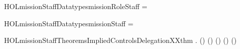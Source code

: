 \newcommand{\HOLmissionStaffDate}{20 August 2016}
\newcommand{\HOLmissionStaffTime}{11:38}
\begin{SaveVerbatim}{HOLmissionStaffDatatypesmissionRoleStaff}
 =   \HOLTokenBar{}  
\end{SaveVerbatim}
\newcommand{\HOLmissionStaffDatatypesmissionRoleStaff}{\UseVerbatim{HOLmissionStaffDatatypesmissionRoleStaff}}
\begin{SaveVerbatim}{HOLmissionStaffDatatypesmissionStaff}
 =  \HOLTokenBar{}  \HOLTokenBar{}  \HOLTokenBar{}  \HOLTokenBar{} 
\end{SaveVerbatim}
\newcommand{\HOLmissionStaffDatatypesmissionStaff}{\UseVerbatim{HOLmissionStaffDatatypesmissionStaff}}
\newcommand{\HOLmissionStaffDatatypes}{
\HOLmissionStaffDatatypesmissionRoleStaff\HOLmissionStaffDatatypesmissionStaff}
\begin{SaveVerbatim}{HOLmissionStaffTheoremsImpliedControlsDelegationXXthm}
\HOLTokenTurnstile{} \HOLSymConst{\HOLTokenForall{}}.
     (\HOLSymConst{,}\HOLSymConst{,})     \HOLSymConst{\HOLTokenImp{}}
     (\HOLSymConst{,}\HOLSymConst{,})      \HOLSymConst{\HOLTokenImp{}}
     (\HOLSymConst{,}\HOLSymConst{,})       \HOLSymConst{\HOLTokenImp{}}
     (\HOLSymConst{,}\HOLSymConst{,})     \HOLSymConst{\HOLTokenImp{}}
     (\HOLSymConst{,}\HOLSymConst{,})    
\end{SaveVerbatim}
\newcommand{\HOLmissionStaffTheoremsImpliedControlsDelegationXXthm}{\UseVerbatim{HOLmissionStaffTheoremsImpliedControlsDelegationXXthm}}
\newcommand{\HOLmissionStaffTheorems}{
\HOLThmTag{missionStaff}{ImpliedControlsDelegation_thm}\HOLmissionStaffTheoremsImpliedControlsDelegationXXthm
}

